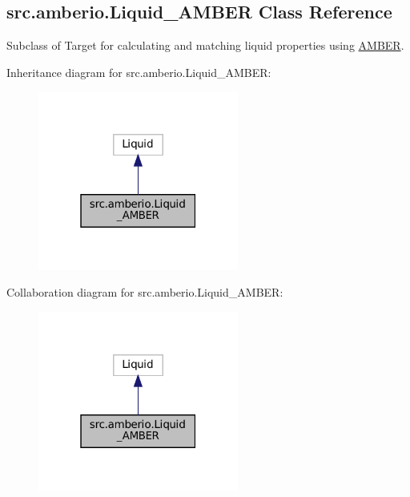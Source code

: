 \hypertarget{classsrc_1_1amberio_1_1Liquid__AMBER}{}\subsection{src.\+amberio.\+Liquid\+\_\+\+A\+M\+B\+ER Class Reference}
\label{classsrc_1_1amberio_1_1Liquid__AMBER}


Subclass of Target for calculating and matching liquid properties using \hyperlink{classsrc_1_1amberio_1_1AMBER}{A\+M\+B\+ER}.  




Inheritance diagram for src.\+amberio.\+Liquid\+\_\+\+A\+M\+B\+ER\+:
\nopagebreak
\begin{figure}[H]
\begin{center}
\leavevmode
\includegraphics[width=187pt]{classsrc_1_1amberio_1_1Liquid__AMBER__inherit__graph}
\end{center}
\end{figure}


Collaboration diagram for src.\+amberio.\+Liquid\+\_\+\+A\+M\+B\+ER\+:
\nopagebreak
\begin{figure}[H]
\begin{center}
\leavevmode
\includegraphics[width=187pt]{classsrc_1_1amberio_1_1Liquid__AMBER__coll__graph}
\end{center}
\end{figure}

